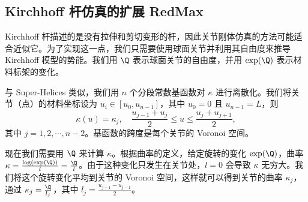  \subsection{Kirchhoff 杆仿真的扩展 RedMax}
\label{model_redMax}
Kirchhoff 杆描述的是没有拉伸和剪切变形的杆，因此关节刚体仿真的方法可能适合近似它。为了实现这一点，我们只需要使用球面关节并利用其自由度来推导 Kirchhoff 模型的势能。我们用 $\Q$ 表示球面关节的自由度，并用 $\exp(\Q)$ 表示材料标架的变化。



与 Super-Helices 类似，我们用 $n$ 个分段常数基函数对 $\kappa$ 进行离散化。我们将关节（点）的材料坐标设为 $u_i \in [u_0, u_{n-1}]$，其中 $u_0 = 0$ 且 $u_{n-1} = L$，则
\begin{equation}
  \kappa(u) = \kappa_j,  \quad   \frac{u_{j-1} + u_j}{2} \leq u \leq \frac{u_j + u_{j+1}}{2},
\end{equation}
其中 $j=1,2,\cdots,n-2$。基函数的跨度是每个关节的 Voronoi 空间。

现在我们需要用 $\Q$ 来计算 $\kappa$。根据曲率的定义，给定旋转的变化 $\exp(\Q)$，曲率 $\kappa = \frac{\log(\exp(\Q))}{l} = \frac{\Q}{l}$。由于这种变化只发生在关节处，$l=0$ 会导致 $\kappa$ 无穷大。我们将这个旋转变化平均到关节的 Voronoi 空间，这样就可以得到关节的曲率 $\kappa_j$，通过 $\kappa_j = \frac{\Q}{l_j}$，其中 $l_j = \frac{u_{j+1} - u_{j-1}}{2}$。


